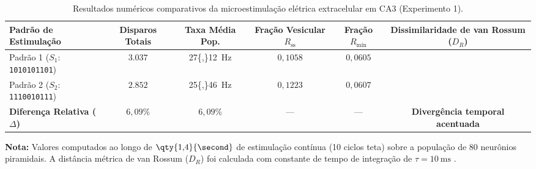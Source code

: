 \begin{table}[tbp]
    \centering
    \small
    \setlength{\tabcolsep}{5pt}
    \caption{Resultados numéricos comparativos da microestimulação elétrica extracelular em CA3 (Experimento 1).}
    \label{tab:resultados_experimento_1_eletrica}
    \begin{adjustbox}{max width=0.98\textwidth}
        \begin{tabular}{lccccc}
            \toprule
            \textbf{Padrão de Estimulação} & \textbf{Disparos Totais} & \textbf{Taxa Média Pop.} & \textbf{Fração Vesicular $R_{\text{ss}}$} & \textbf{Fração $R_{\text{mín}}$} & \textbf{Dissimilaridade de van Rossum ($D_R$)} \\
            \midrule
            Padrão 1 ($S_1$: \texttt{1010101101}) & $3.037$ & \qty{27{,}12}{\hertz} & $0{,}1058$ & $0{,}0605$ &  \\
            Padrão 2 ($S_2$: \texttt{1110010111}) & $2.852$ & \qty{25{,}46}{\hertz} & $0{,}1223$ & $0{,}0607$ & \\
            \midrule
            \textbf{Diferença Relativa ($\Delta$)} & $6{,}09\%$ & $6{,}09\%$ & --- & --- & \textbf{Divergência temporal acentuada} \\
            \bottomrule
        \end{tabular}
    \end{adjustbox}
    \vspace{0.2em}
    \begin{minipage}{0.98\textwidth}
        \footnotesize \textbf{Nota:} Valores computados ao longo de $\qty{1{,}4}{\second}$ de estimulação contínua (10 ciclos teta) sobre a população de 80 neurônios piramidais. A distância métrica de van Rossum ($D_R$) foi calculada com constante de tempo de integração de $\tau = \qty{10}{\milli\second}$ \cite{vanrossum2001}.
    \end{minipage}
\end{table}
